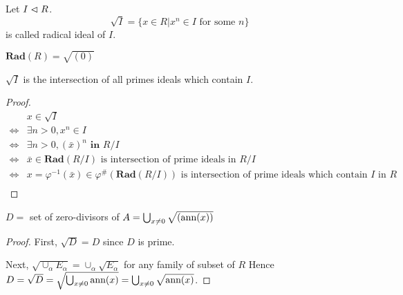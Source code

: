 \documentclass{amsart}
\begin{document}
\begin{secdefn}
	Let $I \vartriangleleft R$.
	\[
	\sqrt{I} = \big\{x \in R| x^n \in I \text{ for some } n \big\}
	\]
	is called radical ideal of $I$.
\end{secdefn}
\begin{rem}
	$\textbf{Rad}(R)= \sqrt{(0)}$
\end{rem}

\begin{secprop}
	$\sqrt{I}$ is the intersection of all primes ideals which contain $I$.
\end{secprop}
\begin{proof}
	\[
	\begin{aligned}
		 & x \in \sqrt{I}&\\
		 \Leftrightarrow& \exists n >0 , x^n \in I&\\
		 \Leftrightarrow& \exists n >0, (\bar{x})^{n} \textbf{ in } R/I&\\
		 \Leftrightarrow& \bar{x} \in \textbf{Rad}(R/I) \text{ is intersection of prime ideals in } R/I&\\
		 \Leftrightarrow& x= \varphi^{-1}(\bar{x}) \in \varphi^{\#}(\textbf{Rad}(R/I))\text{ is intersection of prime ideals which contain }I \text{ in } R&\\
	\end{aligned}
	\]
\end{proof}

\begin{secprop}
	$D=$ set of zero-divisors of $A= \bigcup_{x \neq 0} \sqrt{(\text{ann}(x))}$  
\end{secprop}
\begin{proof}
	First, $\sqrt{D} = D$ since $D$ is prime.
	
	Next, $\sqrt{\cup_{\alpha} E_\alpha} = \cup_{\alpha} \sqrt{E_\alpha}$ for any family of subset of $R$
	Hence $D= \sqrt{D} = \sqrt{\bigcup_{x \neq 0} \text{ann}(x)} = \bigcup_{x \neq 0} \sqrt{\text{ann}(x)}$.
\end{proof}
\end{document}
